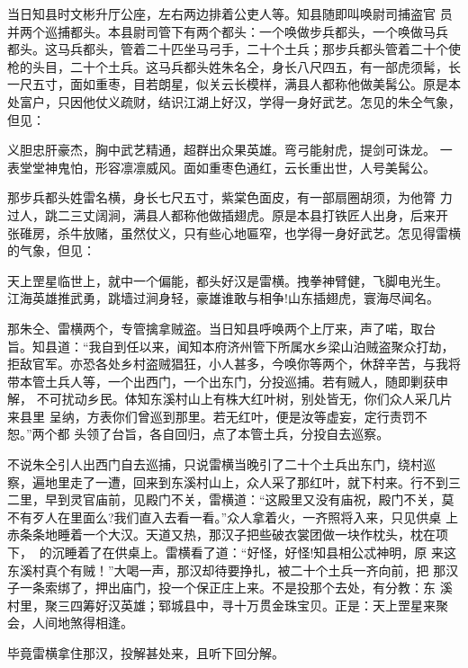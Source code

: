 当日知县时文彬升厅公座，左右两边排着公吏人等。知县随即叫唤尉司捕盗官
员并两个巡捕都头。本县尉司管下有两个都头：一个唤做步兵都头，一个唤做马兵
都头。这马兵都头，管着二十匹坐马弓手，二十个土兵；那步兵都头管着二十个使
枪的头目，二十个土兵。这马兵都头姓朱名仝，身长八尺四五，有一部虎须髯，长
一尺五寸，面如重枣，目若朗星，似关云长模样，满县人都称他做美髯公。原是本
处富户，只因他仗义疏财，结识江湖上好汉，学得一身好武艺。怎见的朱仝气象，
但见：

义胆忠肝豪杰，胸中武艺精通，超群出众果英雄。弯弓能射虎，提剑可诛龙。
一表堂堂神鬼怕，形容凛凛威风。面如重枣色通红，云长重出世，人号美髯公。

那步兵都头姓雷名横，身长七尺五寸，紫棠色面皮，有一部扇圈胡须，为他膂
力过人，跳二三丈阔涧，满县人都称他做插翅虎。原是本县打铁匠人出身，后来开
张碓房，杀牛放赌，虽然仗义，只有些心地匾窄，也学得一身好武艺。怎见得雷横
的气象，但见：

天上罡星临世上，就中一个偏能，都头好汉是雷横。拽拳神臂健，飞脚电光生。
江海英雄推武勇，跳墙过涧身轻，豪雄谁敢与相争!山东插翅虎，寰海尽闻名。

那朱仝、雷横两个，专管擒拿贼盗。当日知县呼唤两个上厅来，声了喏，取台
旨。知县道：“我自到任以来，闻知本府济州管下所属水乡梁山泊贼盗聚众打劫，
拒敌官军。亦恐各处乡村盗贼猖狂，小人甚多，今唤你等两个，休辞辛苦，与我将
带本管土兵人等，一个出西门，一个出东门，分投巡捕。若有贼人，随即剿获申解，
不可扰动乡民。体知东溪村山上有株大红叶树，别处皆无，你们众人采几片来县里
呈纳，方表你们曾巡到那里。若无红叶，便是汝等虚妄，定行责罚不恕。”两个都
头领了台旨，各自回归，点了本管土兵，分投自去巡察。

不说朱仝引人出西门自去巡捕，只说雷横当晚引了二十个土兵出东门，绕村巡
察，遍地里走了一遭，回来到东溪村山上，众人采了那红叶，就下村来。行不到三
二里，早到灵官庙前，见殿门不关，雷横道：“这殿里又没有庙祝，殿门不关，莫
不有歹人在里面么?我们直入去看一看。”众人拿着火，一齐照将入来，只见供桌
上赤条条地睡着一个大汉。天道又热，那汉子把些破衣裳团做一块作枕头，枕在项
下，的沉睡着了在供桌上。雷横看了道：“好怪，好怪!知县相公忒神明，原
来这东溪村真个有贼！”大喝一声，那汉却待要挣扎，被二十个土兵一齐向前，把
那汉子一条索绑了，押出庙门，投一个保正庄上来。不是投那个去处，有分教：东
溪村里，聚三四筹好汉英雄；郓城县中，寻十万贯金珠宝贝。正是：天上罡星来聚
会，人间地煞得相逢。

毕竟雷横拿住那汉，投解甚处来，且听下回分解。